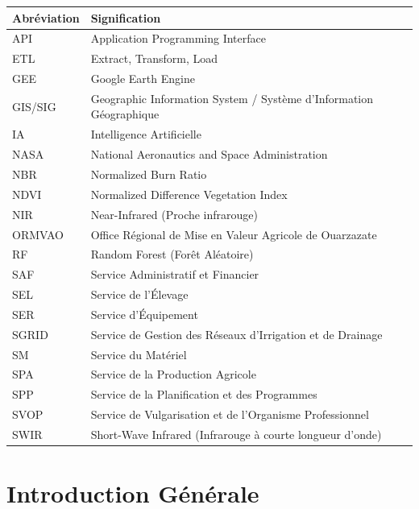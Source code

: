 \documentclass[12pt,a4paper]{report}
\begin{document}
\begin{tabular}{L{3cm} L{10cm}}
\toprule
\textbf{Abréviation} & \textbf{Signification} \\
\midrule
API     & Application Programming Interface \\
ETL     & Extract, Transform, Load \\
GEE     & Google Earth Engine \\
GIS/SIG & Geographic Information System / Système d'Information Géographique \\
IA      & Intelligence Artificielle \\
NASA    & National Aeronautics and Space Administration \\
NBR     & Normalized Burn Ratio \\
NDVI    & Normalized Difference Vegetation Index \\
NIR     & Near-Infrared (Proche infrarouge) \\
ORMVAO  & Office Régional de Mise en Valeur Agricole de Ouarzazate \\
RF      & Random Forest (Forêt Aléatoire) \\
SAF     & Service Administratif et Financier \\
SEL     & Service de l'Élevage \\
SER     & Service d'Équipement \\
SGRID   & Service de Gestion des Réseaux d'Irrigation et de Drainage \\
SM      & Service du Matériel \\
SPA     & Service de la Production Agricole \\
SPP     & Service de la Planification et des Programmes \\
SVOP    & Service de Vulgarisation et de l'Organisme Professionnel \\
SWIR    & Short-Wave Infrared (Infrarouge à courte longueur d'onde) \\
\bottomrule
\end{tabular}

\renewcommand{\contentsname}{Table des Matières}
\renewcommand{\listfigurename}{Liste des Figures}
\renewcommand{\listtablename}{Liste des Tableaux}

\tableofcontents
\newpage
\listoffigures
\listoftables

\chapter*{Introduction Générale}
\end{document}
